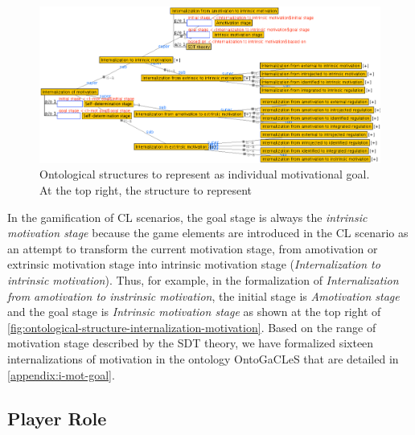 \begin{figure}[htb]
 \caption[Ontological structures to represent Internalization of motivation]{Ontological structures to represent  as individual motivational goal. At the top right, the structure to represent }
 \label{fig:ontological-structure-internalization-motivation}
 \centering
 \includegraphics[width=1\textwidth]{images/chap-ontogacles1/ontological-structure-internalization-motivation.png}
 \fautor
\end{figure}

In the gamification of CL scenarios, the goal stage is always the \emph{intrinsic motivation stage} because the game elements are introduced in the CL scenario as an attempt to transform the current motivation stage, from amotivation or extrinsic motivation stage into intrinsic motivation stage (\emph{Internalization to intrinsic motivation}). Thus, for example, in the formalization of \emph{Internalization from amotivation to instrinsic motivation}, the initial stage is \emph{Amotivation stage} and the goal stage is \emph{Intrinsic motivation stage} as shown at the top right of \autoref{fig:ontological-structure-internalization-motivation}. Based on the range of motivation stage described by the SDT theory, we have formalized sixteen internalizations of motivation in the ontology OntoGaCLeS that are detailed in \autoref{appendix:i-mot-goal}.


\subsection{Player Role}
\label{subsec:player-role}

